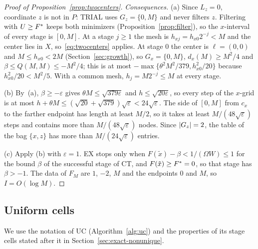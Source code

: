 \begin{proof}[Proof of Proposition~\ref{prop:twocenters}]
\emph{Consequences.} (a) Since $L_z=0$, coordinate $z$ is not in $P$: TRIAL
uses $G_z=\{0,M\}$ and never filters $z$. Filtering with $U\ge F^{*}$ keeps
both minimizers (Proposition~\ref{prop:filter}), so the $x$-interval of every
stage is $[0,M]$. At a stage $j\ge1$ the mesh is $h_{xj}=h_{x0}2^{-j}<M$ and
the center lies in $X$, so~\eqref{eq:twocenters} applies. At stage $0$ the
center is $\ell=(0,0)$ and $M\le h_{x0}<2M$ (Section~\ref{sec:growth}), so
$G_x=\{0,M\}$, $d_x(M)\ge M^2/4$ and $\beta\le Q(M,M)\le-M^2/4$; this is at
most $-\max\{\theta^2M^2/379,h_{x0}^2/20\}$ because $h_{x0}^2/20<M^2/5$.
With a common mesh, $h_j=M2^{-j}\le M$ at every stage.

(b) By~(a), $\beta\ge-\varepsilon$ gives $\theta M\le\sqrt{379\varepsilon}$
and $h\le\sqrt{20\varepsilon}$, so every step of the $x$-grid is at most
$h+\theta M\le(\sqrt{20}+\sqrt{379})\sqrt\varepsilon<24\sqrt\varepsilon$. The
side of $[0,M]$ from $c_x$ to the farther endpoint has length at least $M/2$,
so it takes at least $M/(48\sqrt\varepsilon)$ steps and contains more than
$M/(48\sqrt\varepsilon)$ nodes. Since $\lvert G_z\rvert=2$, the table of the bag
$\{x,z\}$ has more than $M/(24\sqrt\varepsilon)$ entries.

(c) Apply (b) with $\varepsilon=1$. EX stops only when
$F(\tilde x)-\beta<1/(\Omega W)\le1$ for the bound $\beta$ of the successful
stage of CT, and $F(\tilde x)\ge F^{*}=0$, so that stage has $\beta>-1$. The
data of $F_M$ are $1$, $-2$, $M$ and the endpoints $0$ and $M$, so
$I=O(\log M)$.
\end{proof}

\subsection{Uniform cells}\label{app:cells}

We use the notation of UC (Algorithm~\ref{alg:uc}) and the properties of its
stage cells stated after it in Section~\ref{sec:exact-nonunique}.


